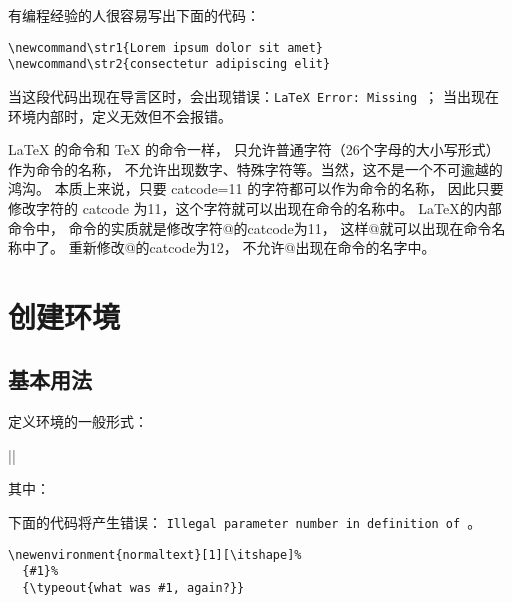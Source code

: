 有编程经验的人很容易写出下面的代码：

\begin{verbatim}
\newcommand\str1{Lorem ipsum dolor sit amet}
\newcommand\str2{consectetur adipiscing elit}
\end{verbatim}

当这段代码出现在导言区时，会出现错误：\texttt{LaTeX Error: Missing }；
当出现在  环境内部时，定义无效但不会报错。

{\LaTeX} 的命令和 {\TeX} 的命令一样，
只允许普通字符（26个字母的大小写形式）作为命令的名称，
不允许出现数字、特殊字符等。当然，这不是一个不可逾越的鸿沟。
本质上来说，只要 catcode=11 的字符都可以作为命令的名称，
因此只要修改字符的 catcode 为11，这个字符就可以出现在命令的名称中。
LaTeX的内部命令中， 命令的实质就是修改字符@的catcode为11，
这样@就可以出现在命令名称中了。 重新修改@的catcode为12，
不允许@出现在命令的名字中。

\section{创建环境 \protect{}}

\subsection{基本用法}

定义环境的一般形式：

|\newenvironment{<环境名>}[<参数个数>][<第一个参数的默认值>]{<环境前定义>}{<环境后定义>}|

其中：

下面的代码将产生错误： \texttt{Illegal parameter number in definition of \endnormaltext}。

\begin{verbatim}
\newenvironment{normaltext}[1][\itshape]%
  {#1}%
  {\typeout{what was #1, again?}}
\end{verbatim}


